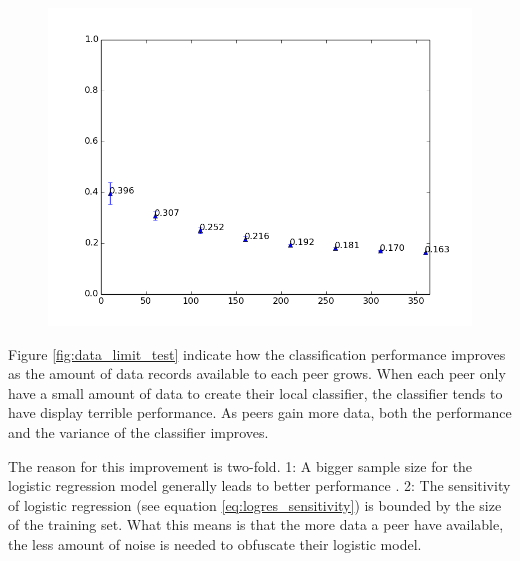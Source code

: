 \begin{figure}[h!]
\begin{minipage}{.49\linewidth}
		\label{fig:data_limit_test_withlocalmodel}
	\end{minipage}
	\begin{minipage}{.49\linewidth}
		\includegraphics[width=\linewidth]{fig/spambase/eps0.1,budg=eps,peers10,groups10,reg2e-2-pubAll-spam-baseline-data10-360-testset-localmodelonly}
		\label{fig:data_limit_test_localmodelonly}
	\end{minipage}
\end{figure}


Figure \ref{fig:data_limit_test} indicate how the classification performance improves as the amount of data records available to each peer grows. When each peer only have a small amount of data to create their local classifier, the classifier tends to have display terrible performance. As peers gain more data, both the performance and the variance of the classifier improves.     

The reason for this improvement is two-fold. 1: A bigger sample size for the logistic regression model generally leads to better performance \cite{peduzzi1996simulation}. 2: The sensitivity of logistic regression (see equation \ref{eq:logres_sensitivity}) is bounded by the size of the training set. What this means is that the more data a peer have available, the less amount of noise is needed to obfuscate their logistic model. 

